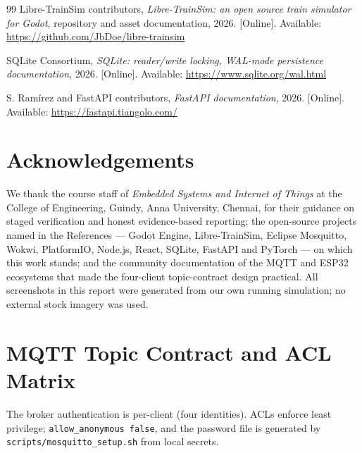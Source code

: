\begin{thebibliography}{99}
 Libre-TrainSim contributors, \emph{Libre-TrainSim: an open
source train simulator for Godot}, repository and asset documentation,
2026. [Online]. Available: \url{https://github.com/JbDoe/libre-trainsim}

 SQLite Consortium, \emph{SQLite: reader/write locking,
WAL-mode persistence documentation}, 2026. [Online]. Available:
\url{https://www.sqlite.org/wal.html}

 S. Ramírez and FastAPI contributors, \emph{FastAPI
documentation}, 2026. [Online]. Available: \url{https://fastapi.tiangolo.com/}

\end{thebibliography}

\clearpage
\chapter*{Acknowledgements}

We thank the course staff of \emph{Embedded Systems and Internet of
Things} at the College of Engineering, Guindy, Anna University, Chennai,
for their guidance on staged verification and honest evidence-based
reporting; the open-source projects named in the References --- Godot
Engine, Libre-TrainSim, Eclipse Mosquitto, Wokwi, PlatformIO, Node.js,
React, SQLite, FastAPI and PyTorch --- on which this work stands; and the
community documentation of the MQTT and ESP32 ecosystems that made the
four-client topic-contract design practical. All screenshots in this
report were generated from our own running simulation; no external stock
imagery was used.

\clearpage
\appendix

\chapter{MQTT Topic Contract and ACL Matrix}\label{cha:appendix-acl}

The broker authentication is per-client (four identities). ACLs enforce
least privilege; \texttt{allow\_anonymous false}, and the password file
is generated by \texttt{scripts/mosquitto\_setup.sh} from local secrets.


